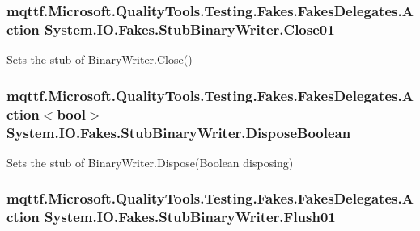 \hypertarget{class_system_1_1_i_o_1_1_fakes_1_1_stub_binary_writer_a935085ba54ce44071e3e51c59ac43178}{
\subsubsection[{Close01}]{\setlength{\rightskip}{0pt plus 5cm}mqttf.\-Microsoft.\-Quality\-Tools.\-Testing.\-Fakes.\-Fakes\-Delegates.\-Action System.\-I\-O.\-Fakes.\-Stub\-Binary\-Writer.\-Close01}}\label{class_system_1_1_i_o_1_1_fakes_1_1_stub_binary_writer_a935085ba54ce44071e3e51c59ac43178}


Sets the stub of Binary\-Writer.\-Close()

\hypertarget{class_system_1_1_i_o_1_1_fakes_1_1_stub_binary_writer_a3ffc59054fb571a1add06b74ba72477c}{
\subsubsection[{Dispose\-Boolean}]{\setlength{\rightskip}{0pt plus 5cm}mqttf.\-Microsoft.\-Quality\-Tools.\-Testing.\-Fakes.\-Fakes\-Delegates.\-Action$<$bool$>$ System.\-I\-O.\-Fakes.\-Stub\-Binary\-Writer.\-Dispose\-Boolean}}\label{class_system_1_1_i_o_1_1_fakes_1_1_stub_binary_writer_a3ffc59054fb571a1add06b74ba72477c}


Sets the stub of Binary\-Writer.\-Dispose(\-Boolean disposing)

\hypertarget{class_system_1_1_i_o_1_1_fakes_1_1_stub_binary_writer_a4da5dc63b29382572db34fe6b893dbfe}{
\subsubsection[{Flush01}]{\setlength{\rightskip}{0pt plus 5cm}mqttf.\-Microsoft.\-Quality\-Tools.\-Testing.\-Fakes.\-Fakes\-Delegates.\-Action System.\-I\-O.\-Fakes.\-Stub\-Binary\-Writer.\-Flush01}}\label{class_system_1_1_i_o_1_1_fakes_1_1_stub_binary_writer_a4da5dc63b29382572db34fe6b893dbfe}


